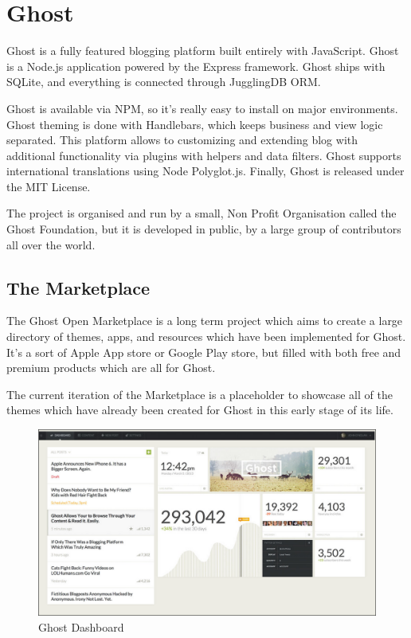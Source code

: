 \section{Ghost}
\label{sec:CMS_ghost}

Ghost is a fully featured blogging platform built entirely with JavaScript.
Ghost is a Node.js application powered by the Express framework. Ghost ships with SQLite, and everything is connected through JugglingDB ORM.

Ghost is available via NPM, so it’s really easy to install on major environments.
Ghost theming is done with Handlebars, which keeps business and view logic separated. 
This platform allows to customizing and extending blog with additional functionality via plugins with helpers and data filters. Ghost supports international translations using Node Polyglot.js.
Finally, Ghost is released under the MIT License. \cite{cms_ghost}

The project is organised and run by a small, Non Profit Organisation called the Ghost Foundation, but it is developed in public, by a large group of contributors all over the world.

\subsection{The Marketplace}
\label{subsec:ghost_market}
The Ghost Open Marketplace is a long term project which aims to create a large directory of themes, apps, and resources which have been implemented for Ghost. It's a sort of Apple App store or Google Play store, but filled with both free and premium products which are all for Ghost.

The current iteration of the Marketplace is a placeholder to showcase all of the themes which have already been created for Ghost in this early stage of its life.\cite{cms_ghost_over}




\begin {figure}[h]
\graphicspath{{images/chapter_cms/}}
\includegraphics[width=\textwidth]{ghost_dash}
\caption{Ghost Dashboard}
\end {figure}